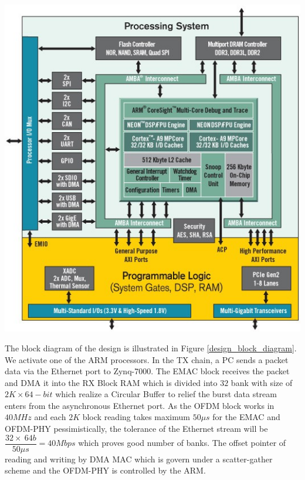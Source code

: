 \begin{center}
\includegraphics[width=\textwidth]{content/fig/zynq_inside.JPG}
\label{zynq_inside}
\end{center}

The block diagram of the design is illustrated in Figure \ref{design_block_diagram}. We activate one of the ARM processors. In the TX chain, a PC sends a packet data via the Ethernet port to Zynq-7000. The EMAC block receives the packet and DMA it into the RX Block RAM which is divided into $32$ bank with size of $2K \times 64-bit$ which realize a Circular Buffer to relief the burst data stream enters from the asynchronous Ethernet port. As the OFDM block works in $40 MHz$ and each $2K$ block reading takes maximum $50\mu s$ for the EMAC and OFDM-PHY pessimistically, the tolerance of the Ethernet stream will be $\dfrac{32 \times \ 64b}{50\mu s} = 40Mbps$ which proves good number of banks. The offset pointer of reading and writing by DMA MAC which is govern under a scatter-gather scheme and the OFDM-PHY is controlled by the ARM.\\

